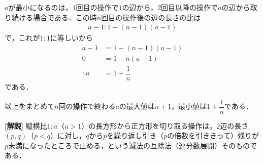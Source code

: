 \documentclass[../../main.tex]{subfiles}
\begin{document}
$a$が最小になるのは，$1$回目の操作で$1$の辺から，$2$回目以降の操作で$a$の辺から取り続ける場合である．この時$n$回目の操作後の辺の長さの比は
\begin{align}
  a-1: 1-(n-1)(a-1)
\end{align}
で，これが$1:1$に等しいから
\begin{align}
  a-1 &= 1 - (n-1)(a-1) \\
  0   &= 1 - n(a-1) \\
  \therefore
  a   &= 1 + \dfrac{1}{n}
\end{align}
である．
\casesend

以上をまとめて$n$回の操作で終わる$a$の最大値は$n+1$，最小値は$1+\dfrac{1}{n}$である．

{\bf [解説]}
縦横比$1:a$（$a>1$）の長方形から正方形を切り取る操作は，2辺の長さ$(p,q)$（$p<q$）に対し，$q$から$p$を繰り返し引き（$p$の倍数を引ききって）残りが$p$未満になったところで止める，という減法の互除法（連分数展開）そのものである．

\newpage
\end{document}
